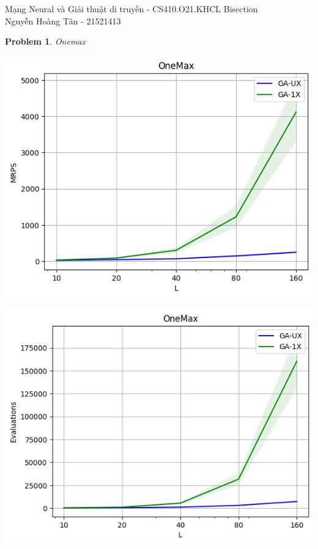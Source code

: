 \documentclass[12pt]{article}
\newtheorem{problem}{Problem}
\begin{document}
\graphicspath{ {Figs/} } 

\noindent Mạng Neural và Giải thuật di truyền - CS410.O21.KHCL \hfill Bisection \\
Nguyễn Hoàng Tân - 21521413

\hrulefill


\begin{problem}
	Onemax
\end{problem}
\begin{minipage}{0.5\linewidth}
	\includegraphics*[scale=0.5]{Onemax_MRPS.png}
\end{minipage}
\begin{minipage}{0.5\linewidth}
	\includegraphics*[scale=0.5]{Onemax_Evaluations.png}
\end{minipage}
\end{document}
